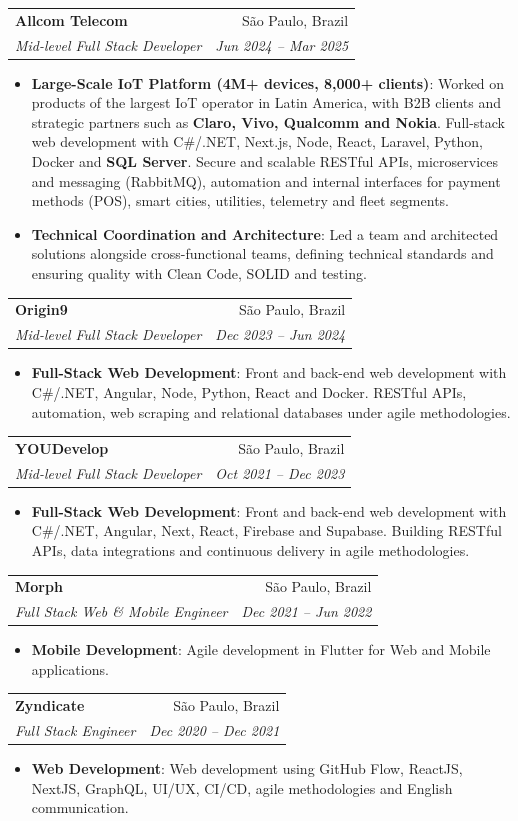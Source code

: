 \documentclass[letterpaper,11pt]{article}
\makeatletter
\newcommand{\resumeItem}[2]{
  \item\small{
    \textbf{#1}{: #2 \vspace{-2pt}}
  }
}
\newcommand{\resumeSubheading}[4]{
  \vspace{-1pt}\item
    \begin{tabular*}{0.97\textwidth}{l@{\extracolsep{\fill}}r}
      \textbf{#1} & #2 \\
      \textit{\small#3} & \textit{\small #4} \\
    \end{tabular*}\vspace{-5pt}
}
\newcommand{\resumeItemListStart}{\begin{itemize}}
\newcommand{\resumeItemListEnd}{\end{itemize}\vspace{-5pt}}
\makeatother
\begin{document}
    \resumeSubheading
      {Allcom Telecom}{São Paulo, Brazil}
      {Mid-level Full Stack Developer}{Jun 2024 -- Mar 2025}
      \resumeItemListStart
        \resumeItem{Large-Scale IoT Platform (4M+ devices, 8,000+ clients)}
          {Worked on products of the largest IoT operator in Latin America, with B2B clients and strategic partners such as \textbf{Claro, Vivo, Qualcomm and Nokia}. Full-stack web development with C\#/.NET, Next.js, Node, React, Laravel, Python, Docker and \textbf{SQL Server}. Secure and scalable RESTful APIs, microservices and messaging (RabbitMQ), automation and internal interfaces for payment methods (POS), smart cities, utilities, telemetry and fleet segments.}
        \resumeItem{Technical Coordination and Architecture}
          {Led a team and architected solutions alongside cross-functional teams, defining technical standards and ensuring quality with Clean Code, SOLID and testing.}
      \resumeItemListEnd

    \resumeSubheading
      {Origin9}{São Paulo, Brazil}
      {Mid-level Full Stack Developer}{Dec 2023 -- Jun 2024}
      \resumeItemListStart
        \resumeItem{Full-Stack Web Development}
          {Front and back-end web development with C\#/.NET, Angular, Node, Python, React and Docker. RESTful APIs, automation, web scraping and relational databases under agile methodologies.}
      \resumeItemListEnd

    \resumeSubheading
      {YOUDevelop}{São Paulo, Brazil}
      {Mid-level Full Stack Developer}{Oct 2021 -- Dec 2023}
      \resumeItemListStart
        \resumeItem{Full-Stack Web Development}
          {Front and back-end web development with C\#/.NET, Angular, Next, React, Firebase and Supabase. Building RESTful APIs, data integrations and continuous delivery in agile methodologies.}
      \resumeItemListEnd

    \resumeSubheading
      {Morph}{São Paulo, Brazil}
      {Full Stack Web \& Mobile Engineer}{Dec 2021 -- Jun 2022}
      \resumeItemListStart
        \resumeItem{Mobile Development}
          {Agile development in Flutter for Web and Mobile applications.}
      \resumeItemListEnd

    \resumeSubheading
      {Zyndicate}{São Paulo, Brazil}
      {Full Stack Engineer}{Dec 2020 -- Dec 2021}
      \resumeItemListStart
        \resumeItem{Web Development}
          {Web development using GitHub Flow, ReactJS, NextJS, GraphQL, UI/UX, CI/CD, agile methodologies and English communication.}
      \resumeItemListEnd
\end{document}
